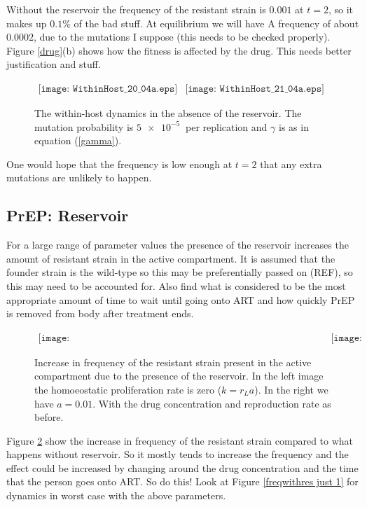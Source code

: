 \documentclass[DIV=15]{scrartcl}
\begin{document}
 Without the reservoir the frequency of the resistant strain  is $0.001$  at $t=2$, so it  makes up  $0.1 \%$ of the bad stuff. At equilibrium we will have A frequency of about $0.0002$, due to the mutations I suppose (this needs to be checked properly).
 Figure \ref{drug}(b) shows how the  fitness is affected by the drug. This needs better justification and stuff.
\begin{figure}[h]
 \begin{center}$
 \begin{array}{cc}
 \texttt{[image: WithinHost\_20\_04a.eps]} &
 \texttt{[image: WithinHost\_21\_04a.eps]}
 \end{array}$
 \end{center}
 \caption{The within-host dynamics in the  absence of the reservoir. The mutation probability is $\SI{5e-5}{}$ per replication and $ \gamma $ is as in equation (\ref{gamma}).}
 \label{freqwithoutres}
 \end{figure}
 One would hope that the frequency is low enough at $t=2$ that any extra mutations are unlikely to happen.
 
 \subsection*{PrEP: Reservoir}

For a large range of parameter values the presence of the reservoir increases the amount of resistant strain in the active compartment. It is assumed that the founder strain is the wild-type so this may be preferentially passed on (REF), so this may need to be accounted for. Also find what is considered to be the most appropriate amount of time to wait until going onto ART and how quickly PrEP is removed from body after treatment ends.
\begin{figure}[h]
 \begin{center}$
 \begin{array}{cc}
 \texttt{[image: FrequencyofResistantStraininActiveCompartment\_20\_04a.jpg]} &
 \texttt{[image: FrequencyofResistantStraininActiveCompartment\_20\_04b.jpg]}
 \end{array}$
 \end{center}
 \caption{Increase in frequency of  the resistant strain present in the active compartment due to the presence of the reservoir. In the left image the homoeostatic proliferation rate is zero ($k = r_L a$). In the right we have $a = 0.01$. With the drug concentration and reproduction rate as before.}
 \label{freqwithres}
 \end{figure}
Figure \ref{freqwithres} show the increase in frequency of the resistant strain compared to what happens without reservoir.  So it mostly tends to increase the frequency and the effect could be increased by changing around the drug concentration and the time that the person goes onto ART. So do this! Look at Figure \ref{freqwithres just 1} for dynamics in worst case with the above parameters.
\end{document}
